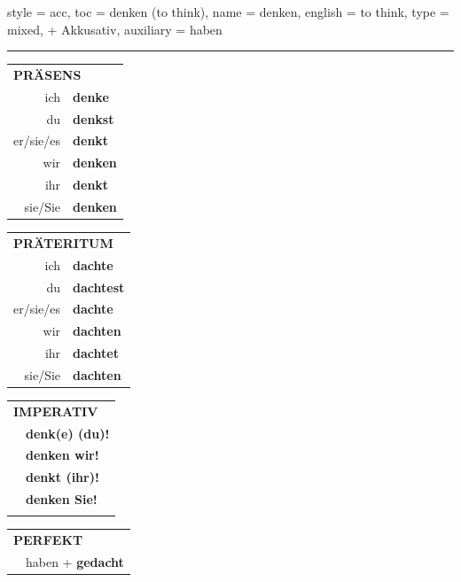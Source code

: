 \begin{verbentry}{
  style = {acc},
  toc = {denken (to think)},
  name = {denken},
  english = {to think},
  type = {mixed, + Akkusativ},
  auxiliary = {haben}
}
 
    
     \vspace{5pt}

    \hrule
    
    \vspace{5pt}

  \begin{tabular}{rl}
     \multicolumn{2}{l}{\textbf{PRÄSENS} }\\
    ich & \textbf{denke}\\
    du & \textbf{denkst}\\
    er/sie/es & \textbf{denkt}\\
    wir & \textbf{denken}\\
    ihr & \textbf{denkt}\\
    sie/Sie & \textbf{denken}\\
  \end{tabular}
  \hfill
     \begin{tabular}{rl}
    \multicolumn{2}{l}{\textbf{PRÄTERITUM} }\\
    ich & \textbf{dachte}\\
    du & \textbf{dachtest}\\
    er/sie/es & \textbf{dachte}\\
    wir & \textbf{dachten}\\
    ihr & \textbf{dachtet}\\
    sie/Sie & \textbf{dachten}\\
  \end{tabular}
  \hfill
  \begin{tabular}{rl}
     \multicolumn{2}{l}{\textbf{IMPERATIV} }\\
   & \textbf{denk(e) (du)!}\\
   & \textbf{denken wir!}\\
   & \textbf{denkt (ihr)!}\\
   & \textbf{denken Sie!}\\
   & \vspace{10pt}
  \end{tabular}

    \vspace{10pt}

 \begin{tabular}{rl}
     \multicolumn{2}{l}{\textbf{PERFEKT}}\\
  &  haben + \textbf{gedacht}\\
  \end{tabular}
\hfill
   \begin{tabular}{rl}
   

\end{tabular}
\end{verbentry}
